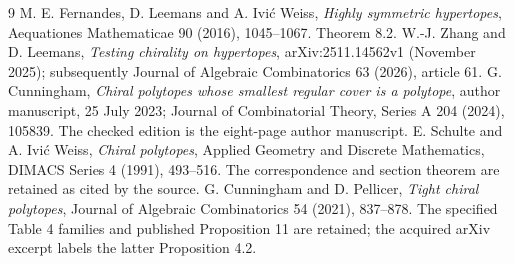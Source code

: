 \begin{thebibliography}{9}
 M. E. Fernandes, D. Leemans and A. Ivi\'c Weiss, \emph{Highly symmetric hypertopes}, Aequationes Mathematicae 90 (2016), 1045--1067. Theorem 8.2.
 W.-J. Zhang and D. Leemans, \emph{Testing chirality on hypertopes}, arXiv:2511.14562v1 (November 2025); subsequently Journal of Algebraic Combinatorics 63 (2026), article 61.
 G. Cunningham, \emph{Chiral polytopes whose smallest regular cover is a polytope}, author manuscript, 25 July 2023; Journal of Combinatorial Theory, Series A 204 (2024), 105839. The checked edition is the eight-page author manuscript.
 E. Schulte and A. Ivi\'c Weiss, \emph{Chiral polytopes}, Applied Geometry and Discrete Mathematics, DIMACS Series 4 (1991), 493--516. The correspondence and section theorem are retained as cited by the source.
 G. Cunningham and D. Pellicer, \emph{Tight chiral polytopes}, Journal of Algebraic Combinatorics 54 (2021), 837--878. The specified Table 4 families and published Proposition 11 are retained; the acquired arXiv excerpt labels the latter Proposition 4.2.
\end{thebibliography}
